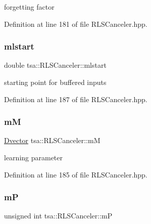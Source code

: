forgetting factor 

Definition at line 181 of file R\+L\+S\+Canceler.\+hpp.

\mbox{\label{classtsa_1_1_r_l_s_canceler_a68cb1250ac509a8f038e6541b5b14c99}} 
\subsubsection{\texorpdfstring{mlstart}{mlstart}}
{\footnotesize\ttfamily double tsa\+::\+R\+L\+S\+Canceler\+::mlstart\hspace{0.3cm}{\ttfamily [private]}}

starting point for buffered inputs 

Definition at line 187 of file R\+L\+S\+Canceler.\+hpp.

\mbox{\label{classtsa_1_1_r_l_s_canceler_ab23f9b24f1909251587df0ec11218a4e}} 
\subsubsection{\texorpdfstring{mM}{mM}}
{\footnotesize\ttfamily \hyperlink{namespacetsa_a8900fb03d849baf447a1a0efe2561fb2}{Dvector} tsa\+::\+R\+L\+S\+Canceler\+::mM\hspace{0.3cm}{\ttfamily [private]}}

learning parameter 

Definition at line 185 of file R\+L\+S\+Canceler.\+hpp.

\mbox{\label{classtsa_1_1_r_l_s_canceler_ac96db09b7154fb657b33325c7dcb0ba9}} 
\subsubsection{\texorpdfstring{mP}{mP}}
{\footnotesize\ttfamily unsigned int tsa\+::\+R\+L\+S\+Canceler\+::mP\hspace{0.3cm}{\ttfamily [private]}}

